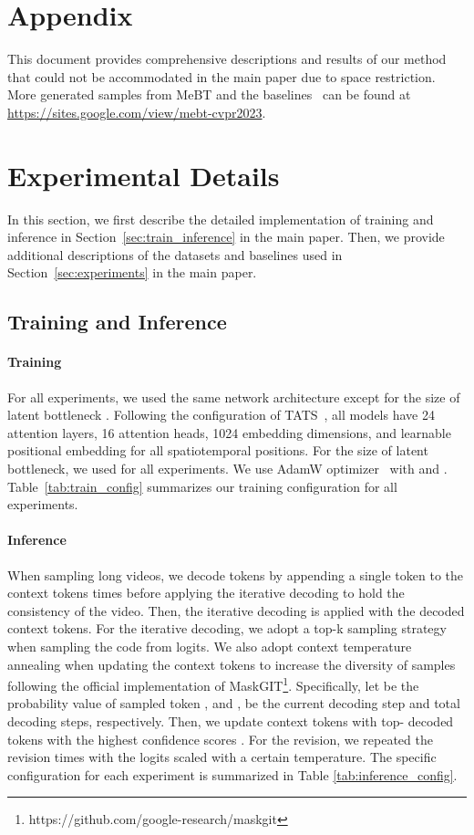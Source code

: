 \documentclass[10pt,twocolumn,letterpaper]{article}
\begin{document}
\appendix

\section*{Appendix}
This document provides comprehensive descriptions and results of our method that could not be accommodated in the main paper due to space restriction. More generated samples from MeBT and the baselines~\cite{MoCoGAN-HD, DIGAN, TATS, CCVS} can be found at \href{https://sites.google.com/view/mebt-cvpr2023}{https://sites.google.com/view/mebt-cvpr2023}.

\section{Experimental Details}
\label{appx:experiment}
In this section, we first describe the detailed implementation of training and inference in Section~\ref{sec:train_inference} in the main paper.
Then, we provide additional descriptions of the datasets and baselines used in Section~\ref{sec:experiments} in the main paper.

\subsection{Training and Inference}
\label{appx:training_inference}
\paragraph{Training}
\label{appx:training}
For all experiments, we used the same network architecture except for the size of latent bottleneck . Following the configuration of TATS~\cite{TATS}, all models have 24 attention layers, 16 attention heads, 1024 embedding dimensions, and learnable positional embedding for all spatiotemporal positions. For the size of latent bottleneck, we used  for all experiments.
We use AdamW optimizer~\cite{AdamW} with  and . Table~\ref{tab:train_config} summarizes our training configuration for all experiments.

\paragraph{Inference}
\label{appx:inference}
When sampling long videos, we decode  tokens by appending a single token to the context tokens  times before applying the iterative decoding to hold the consistency of the video. Then, the iterative decoding is applied with the  decoded context tokens. For the iterative decoding, we adopt a top-k sampling strategy when sampling the code from logits. We also adopt context temperature annealing when updating the context tokens to increase the diversity of samples following the official implementation of MaskGIT\footnote{https://github.com/google-research/maskgit}. Specifically, let  be the probability value of sampled token , and ,  be the current decoding step and total decoding steps, respectively. Then, we update context tokens with top- decoded tokens with the highest confidence scores . For the revision, we repeated the revision  times with the logits scaled with a certain temperature. The specific configuration for each experiment is summarized in Table \ref{tab:inference_config}. 
\end{document}
